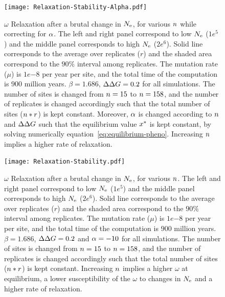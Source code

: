 \begin{figure}[H]
    \centering
    \texttt{[image: Relaxation-Stability-Alpha.pdf]}
    \caption[Relaxation time of $\omega$ dependence on $\NbrSites$, while correction for $\DeltaGmin$]{
    $\omega$ Relaxation after a brutal change in $N_{\text{e}}$, for various $\NbrSites$ while correcting for $\DeltaGmin$.
    The left and right panel correspond to low $N_{\text{e}}$ ($1e^{5}$) and the middle panel corresponds to high $N_{\text{e}}$ ($2e^{6}$).
    Solid line corresponds to the average over replicates ($r$) and the shaded area correspond to the $90\%$ interval among replicates.
    The mutation rate ($\mu$) is $1e{-8}$ per year per site, and the total time of the computation is $900$ million years.
    $\beta=1.686$, $\Delta \Delta G=0.2$ for all simulations. The number of sites is changed from $n=15$ to $n=158$, and the number of replicates is changed accordingly such that the total number of sites ($n*r$) is kept constant.
    Moreover, $\DeltaGmin$ is changed according to $\NbrSites$ and $\Delta \Delta G$ such that the equilibrium value $x^{*}$ is kept constant, by solving numerically equation~\ref{eq:equilibrium-pheno}.
    Increasing $\NbrSites$ implies a higher rate of relaxation.}
\end{figure}

\begin{figure}[H]
    \centering
    \texttt{[image: Relaxation-Stability.pdf]}
    \caption[Relaxation time of $\omega$ dependence on $\NbrSites$]{
    $\omega$ Relaxation after a brutal change in $N_{\text{e}}$, for various $\NbrSites$.
    The left and right panel correspond to low $N_{\text{e}}$ ($1e^{5}$) and the middle panel corresponds to high $N_{\text{e}}$ ($2e^{6}$).
    Solid line corresponds to the average over replicates ($r$) and the shaded area correspond to the $90\%$ interval among replicates.
    The mutation rate ($\mu$) is $1e{-8}$ per year per site, and the total time of the computation is $900$ million years.
    $\beta=1.686$, $\Delta \Delta G=0.2$ and $\alpha=-10$ for all simulations. The number of sites is changed from $n=15$ to $n=158$, and the number of replicates is changed accordingly such that the total number of sites ($n*r$) is kept constant.
    Increasing $\NbrSites$ implies a higher $\omega$ at equilibrium, a lower susceptibility of the $\omega$ to changes in $N_{\text{e}}$ and a higher rate of relaxation.
    }
\end{figure}

